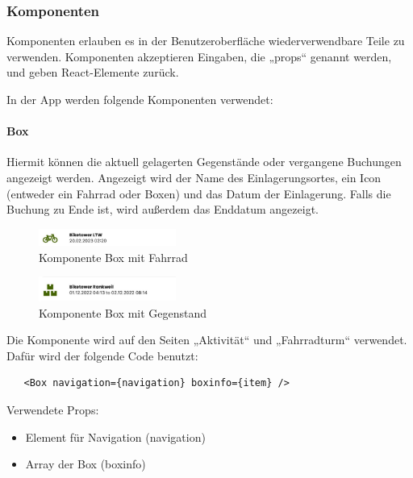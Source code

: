 \subsubsection{Komponenten}
Komponenten erlauben es in der Benutzeroberfläche wiederverwendbare Teile zu verwenden. Komponenten akzeptieren Eingaben, die „props“ genannt werden, und geben React-Elemente zurück.\cite{komponenten}


In der App werden folgende Komponenten verwendet:

\paragraph{Box}

Hiermit können die aktuell gelagerten Gegenstände oder vergangene Buchungen angezeigt werden. Angezeigt wird der Name des Einlagerungsortes, ein Icon (entweder ein Fahrrad oder Boxen) und das Datum der Einlagerung. Falls die Buchung zu Ende ist, wird außerdem das Enddatum angezeigt.\\

\begin{figure}[H]
    \centering
    \includegraphics[width=0.4\textwidth]{images/app-screenshots/boxwithbike.png}
    \caption{Komponente Box mit Fahrrad}
    \label{fig:boxwithbike}
\end{figure}
\begin{figure}[H]
    \centering
    \includegraphics[width=0.4\textwidth]{images/app-screenshots/boxwithitem.png}
    \caption{Komponente Box mit Gegenstand}
    \label{fig:boxwithitem}
\end{figure}

Die Komponente wird auf den Seiten „Aktivität“ und „Fahrradturm“ verwendet. Dafür wird der folgende Code benutzt:\\

\begin{verbatim}
   <Box navigation={navigation} boxinfo={item} />
\end{verbatim}

Verwendete Props:
\begin{itemize}
    \item Element für Navigation (navigation)
    \item Array der Box (boxinfo)
\end{itemize}

